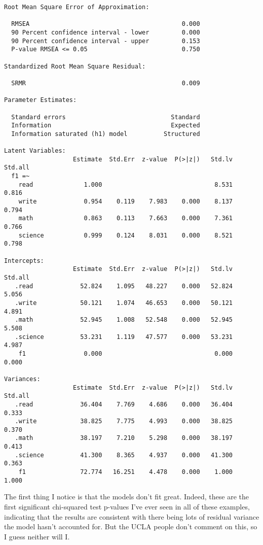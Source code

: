 \documentclass[
  letterpaper,
  DIV=11,
  numbers=noendperiod]{scrreprt}
\begin{document}
\begin{verbatim}
Root Mean Square Error of Approximation:

  RMSEA                                          0.000
  90 Percent confidence interval - lower         0.000
  90 Percent confidence interval - upper         0.153
  P-value RMSEA <= 0.05                          0.750

Standardized Root Mean Square Residual:

  SRMR                                           0.009

Parameter Estimates:

  Standard errors                             Standard
  Information                                 Expected
  Information saturated (h1) model          Structured

Latent Variables:
                   Estimate  Std.Err  z-value  P(>|z|)   Std.lv  Std.all
  f1 =~                                                                 
    read              1.000                               8.531    0.816
    write             0.954    0.119    7.983    0.000    8.137    0.794
    math              0.863    0.113    7.663    0.000    7.361    0.766
    science           0.999    0.124    8.031    0.000    8.521    0.798

Intercepts:
                   Estimate  Std.Err  z-value  P(>|z|)   Std.lv  Std.all
   .read             52.824    1.095   48.227    0.000   52.824    5.056
   .write            50.121    1.074   46.653    0.000   50.121    4.891
   .math             52.945    1.008   52.548    0.000   52.945    5.508
   .science          53.231    1.119   47.577    0.000   53.231    4.987
    f1                0.000                               0.000    0.000

Variances:
                   Estimate  Std.Err  z-value  P(>|z|)   Std.lv  Std.all
   .read             36.404    7.769    4.686    0.000   36.404    0.333
   .write            38.825    7.775    4.993    0.000   38.825    0.370
   .math             38.197    7.210    5.298    0.000   38.197    0.413
   .science          41.300    8.365    4.937    0.000   41.300    0.363
    f1               72.774   16.251    4.478    0.000    1.000    1.000
\end{verbatim}

The first thing I notice is that the models don't fit great. Indeed,
these are the first significant chi-squared test p-values I've ever seen
in all of these examples, indicating that the results are consistent
with there being lots of residual variance the model hasn't accounted
for. But the UCLA people don't comment on this, so I guess neither will
I.
\end{document}
